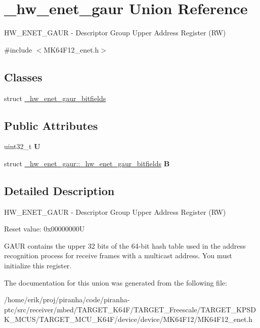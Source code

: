 \hypertarget{union__hw__enet__gaur}{}\section{\+\_\+hw\+\_\+enet\+\_\+gaur Union Reference}
\label{union__hw__enet__gaur}


H\+W\+\_\+\+E\+N\+E\+T\+\_\+\+G\+A\+UR -\/ Descriptor Group Upper Address Register (RW)  




{\ttfamily \#include $<$M\+K64\+F12\+\_\+enet.\+h$>$}

\subsection*{Classes}
\begin{DoxyCompactItemize}
\item 
struct \hyperlink{struct__hw__enet__gaur_1_1__hw__enet__gaur__bitfields}{\+\_\+hw\+\_\+enet\+\_\+gaur\+\_\+bitfields}
\end{DoxyCompactItemize}
\subsection*{Public Attributes}
\begin{DoxyCompactItemize}
\item 
uint32\+\_\+t {\bfseries U}\hypertarget{union__hw__enet__gaur_ab7a712705f07cb24f3b5126666ce749b}{}\label{union__hw__enet__gaur_ab7a712705f07cb24f3b5126666ce749b}

\item 
struct \hyperlink{struct__hw__enet__gaur_1_1__hw__enet__gaur__bitfields}{\+\_\+hw\+\_\+enet\+\_\+gaur\+::\+\_\+hw\+\_\+enet\+\_\+gaur\+\_\+bitfields} {\bfseries B}\hypertarget{union__hw__enet__gaur_a5436282a7563378d4126efee48d641bb}{}\label{union__hw__enet__gaur_a5436282a7563378d4126efee48d641bb}

\end{DoxyCompactItemize}


\subsection{Detailed Description}
H\+W\+\_\+\+E\+N\+E\+T\+\_\+\+G\+A\+UR -\/ Descriptor Group Upper Address Register (RW) 

Reset value\+: 0x00000000U

G\+A\+UR contains the upper 32 bits of the 64-\/bit hash table used in the address recognition process for receive frames with a multicast address. You must initialize this register. 

The documentation for this union was generated from the following file\+:\begin{DoxyCompactItemize}
\item 
/home/erik/proj/piranha/code/piranha-\/ptc/src/receiver/mbed/\+T\+A\+R\+G\+E\+T\+\_\+\+K64\+F/\+T\+A\+R\+G\+E\+T\+\_\+\+Freescale/\+T\+A\+R\+G\+E\+T\+\_\+\+K\+P\+S\+D\+K\+\_\+\+M\+C\+U\+S/\+T\+A\+R\+G\+E\+T\+\_\+\+M\+C\+U\+\_\+\+K64\+F/device/device/\+M\+K64\+F12/M\+K64\+F12\+\_\+enet.\+h\end{DoxyCompactItemize}
